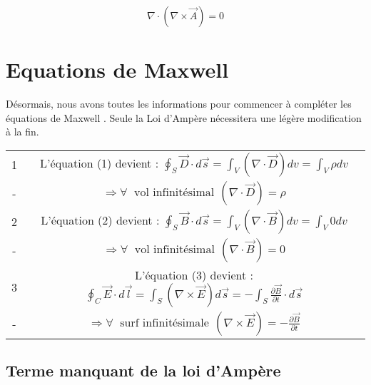 \[\nabla \cdot (\nabla \times \vec{A})  = 0 \]

\section{Equations de Maxwell}
Désormais, nous avons toutes les informations pour commencer à compléter les équations de Maxwell . 
Seule la Loi d'Ampère nécessitera une légère modification à la fin.

\begin{center}

\begin{tabular}{|c|c|}

\hline

1 & L'équation (1) devient : $ \oint_{S} \vec{D} \cdot d\vec{s}  =  \int_{V} (\nabla \cdot \vec{D} ) dv =  \int_{V} \rho dv$ \\  
- & $\Rightarrow \forall  \hspace{3pt} \mbox{ vol infinitésimal} \hspace{5pt} (\nabla \cdot \vec{D} ) = \rho$  \\

\hline

2 & L'équation (2) devient : $ \oint_{S} \vec{B} \cdot d\vec{s}  =  \int_{V} (\nabla \cdot \vec{B} ) dv =  \int_{V} 0 dv$ \\ 
- & $\Rightarrow \forall  \hspace{3pt} \mbox{ vol infinitésimal} \hspace{5pt} (\nabla \cdot \vec{B} ) = 0 $ \\

\hline

3 & L'équation (3) devient : $   \oint_{C} \vec{E} \cdot d\vec{l} = \int_{S} (\nabla \times \vec{E}) d\vec{s}= -\int_{S} \frac{\partial \vec{B}}{\partial t} \cdot d\vec{s}$ \\  
- &$ \Rightarrow \forall  \hspace{3pt} \mbox{ surf infinitésimale} \hspace{5pt} (\nabla \times \vec{E} ) = -\frac{\partial \vec{B}}{\partial t}$\\

\hline

\end{tabular}

\end{center}

\subsection{Terme manquant de la loi d'Ampère}

